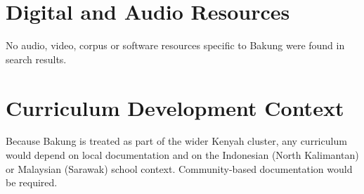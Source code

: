 \documentclass[12pt]{article}
\begin{document}
\section{Digital and Audio Resources}
No audio, video, corpus or software resources specific to Bakung were found in search results.

\section{Curriculum Development Context}
Because Bakung is treated as part of the wider Kenyah cluster, any curriculum would depend on local documentation and on the Indonesian (North Kalimantan) or Malaysian (Sarawak) school context. Community-based documentation would be required.
\end{document}
